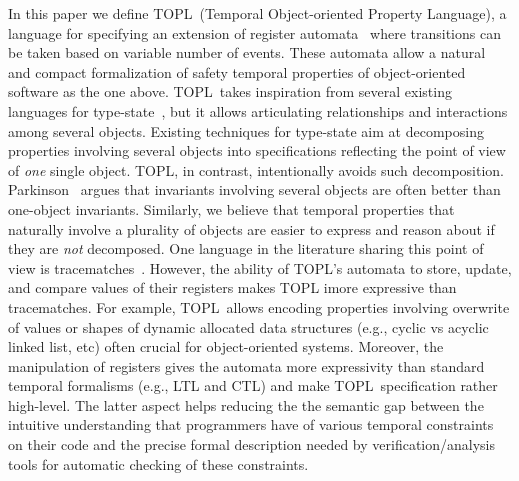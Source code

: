 \documentclass{llncs} %
\newcommand{\TPL}{TOPL}
\begin{document}
In this paper we define  \TPL\ (Temporal Object-oriented Property Language), a language for specifying an extension of register automata~\cite{DBLP:journals/tocl/DemriL09} where transitions can be taken based on variable number of 
events. These automata allow a natural and compact formalization of safety temporal properties of
object-oriented software as the one above. 
\TPL \ takes inspiration from several existing  languages for type-state~\cite{strom1986,dblp:conf/oopsla/bierhoffa07,dblp:conf/oopsla/naeeml08,disney2011,ball2002}, but  it allows 
articulating  relationships and interactions among several objects.
Existing techniques for type-state aim at decomposing properties involving several objects into specifications reflecting the point of view of {\em one} single object. TOPL, in contrast,  intentionally avoids such decomposition.
Parkinson~\cite{parkinson-iwaco2007} argues that invariants involving several objects are often better than one-object invariants.  Similarly, we believe that temporal properties that naturally involve a plurality of objects are easier to express and reason about if they are \emph{not} decomposed. 
One language in the literature sharing this point of view is tracematches~\cite{DBLP:conf/oopsla/AllanACHKLMSST05}. 
%
However, the ability of \TPL's automata to store,  update, and compare values of their registers 
makes TOPL imore expressive than tracematches. For example, \TPL \ allows encoding properties involving overwrite of values or shapes of dynamic allocated data structures (e.g., cyclic vs acyclic linked list, etc) often crucial for object-oriented systems. Moreover, the manipulation of registers  gives the automata more expressivity than standard temporal formalisms (e.g., LTL and CTL) and make \TPL \ specification rather high-level. The latter aspect
helps reducing the the semantic gap between the intuitive understanding that programmers have of various temporal constraints on their code and the precise formal description needed by verification/analysis tools for automatic checking of these constraints.
\end{document}
